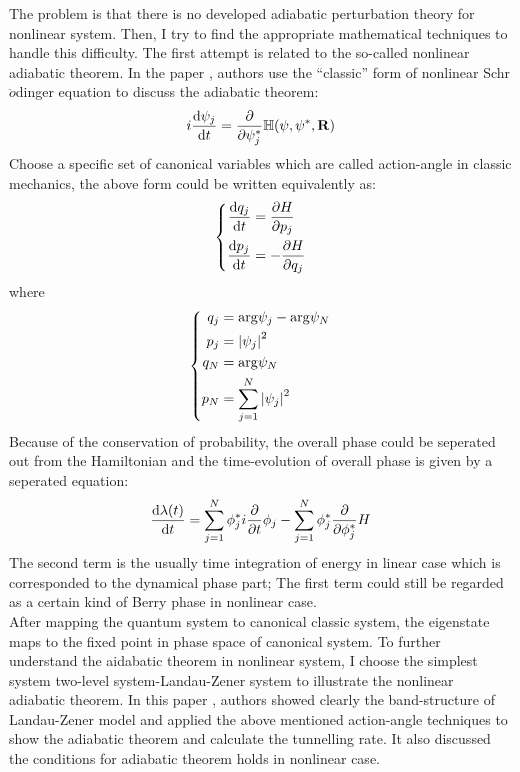 \documentclass[fontsize=11pt, %
                             paper=a4, %
                             twoside, %
                             captions=tableheading,
                             index=totoc,
                             hyperref]{labbook}
\begin{document}
\begin{addmargin}[4cm]{0cm}
The problem is that there is no developed adiabatic perturbation theory for nonlinear system. Then, I try to find the appropriate mathematical techniques to handle this difficulty. The first attempt is related to the so-called nonlinear adiabatic theorem\cite{PhysRevLett.90.170404,PhysRevA.81.052112}. In the paper \cite{PhysRevLett.90.170404}, authors use the ``classic'' form of nonlinear Schr$\ddot{o}$dinger equation to discuss the adiabatic theorem:
\begin{equation}
i\frac{\mathrm{d} \psi_j}{\mathrm{d} t}=\frac{\partial }{\partial \psi_j^\ast}\mathbb{H}(\psi,\psi^\ast,\mathbf{R})
\end{equation}
Choose a specific set of canonical variables which are called action-angle in classic mechanics, the above form could be written equivalently as:
\begin{equation}
\left\{
\begin{aligned}
\frac{\mathrm{d} q_j}{\mathrm{d} t}&=\frac{\partial H}{\partial p_j}\\
\frac{\mathrm{d} p_j}{\mathrm{d} t}&=-\frac{\partial H}{\partial q_j}
\end{aligned}
\right.
\end{equation}
where
\begin{equation}
\left\{
\begin{aligned}
q_j&=\mathrm{arg}\psi_j - \mathrm{arg} \psi_N\\
p_j&=\left| \psi_j \right|^2\\
q_N&=\mathrm{arg} \psi_N\\
p_N&=\sum_{j=1}^N \left| \psi_j \right|^2
\end{aligned}
\right.
\end{equation}
Because of the conservation of probability, the overall phase could be seperated out from the Hamiltonian and the time-evolution of overall phase is given by a seperated equation:
\begin{equation}
\frac{\mathrm{d} \lambda(t)}{\mathrm{d} t}=\sum_{j=1}^N \phi_j^\ast i \frac{\partial }{\partial t}\phi_j - \sum_{j=1}^N \phi_j^\ast \frac{\partial }{\partial \phi_j^\ast}H
\end{equation}
The second term is the usually time integration of energy in linear case which is corresponded to the dynamical phase part; The first term could still be regarded as a certain kind of Berry phase in nonlinear case\cite{PhysRevA.81.052112}. \\

After mapping the quantum system to canonical classic system, the eigenstate maps to the fixed point in phase space of canonical system. To further understand the aidabatic theorem in nonlinear system, I choose the simplest system two-level system-Landau-Zener system to illustrate the nonlinear adiabatic theorem\cite{PhysRevA.66.023404}. In this paper \cite{PhysRevA.66.023404}, authors showed clearly the band-structure of Landau-Zener model and applied the above mentioned action-angle techniques to show the adiabatic theorem and calculate the tunnelling rate. It also discussed the conditions for adiabatic theorem holds in nonlinear case.\\


\end{addmargin}
\end{document}
